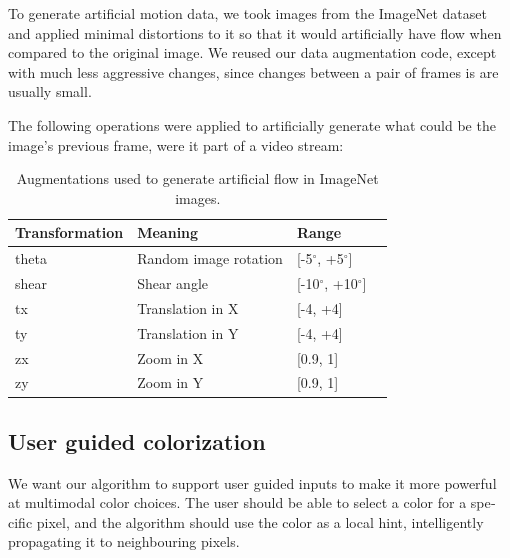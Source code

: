 \documentclass[12pt,openright,twoside,a4paper,english]{abntex2}
\begin{document}
\begin{otherlanguage}{english}
To generate artificial motion data, we took images from the ImageNet dataset and applied minimal distortions to it so that it would artificially have flow when compared to the original image. We reused our data augmentation code, except with much less aggressive changes, since changes between a pair of frames is are usually small.

The following operations were applied to artificially generate what could be the image's previous frame, were it part of a video stream:

\begin{table}[H]
    \centering
    \begin{tabular}{llll}
    Transformation & Meaning               & Range          &  \\ \hline
    theta          & Random image rotation & [-5$^{\circ}$, +5$^{\circ}$]   &  \\
    shear          & Shear angle           & [-10$^{\circ}$, +10$^{\circ}$] &  \\ \hline
    tx             & Translation in X      & [-4, +4]       &  \\
    ty             & Translation in Y      & [-4, +4]       &  \\ \hline
    zx             & Zoom in X             & [0.9, 1]       &  \\
    zy             & Zoom in Y             & [0.9, 1]       &  \\ \hline
    \end{tabular}
    \label{table:augmentations_imagenet}
    \caption{Augmentations used to generate artificial flow in ImageNet images.}
\end{table}







\subsection{User guided colorization}
We want our algorithm to support user guided inputs to make it more powerful at multimodal color choices. The user should be able to select a color for a specific pixel, and the algorithm should use the color as a local hint, intelligently propagating it to neighbouring pixels.


\end{otherlanguage}
\end{document}
